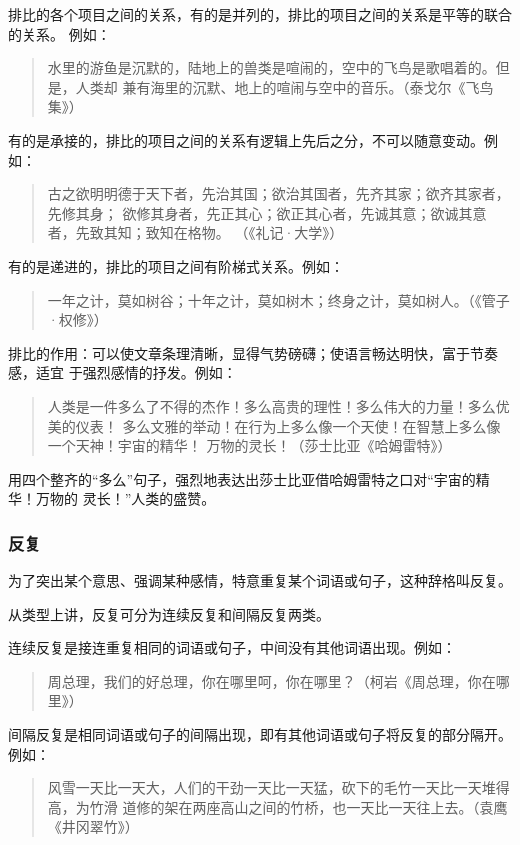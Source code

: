 \documentclass[final,oneside]{ctexbook}
\newenvironment{equotation}{\begin{quotation}\kaishu}{\end{quotation}}
\begin{document}
排比的各个项目之间的关系，有的是并列的，排比的项目之间的关系是平等的联合的关系。
例如：
\begin{equotation}
  水里的游鱼是沉默的，陆地上的兽类是喧闹的，空中的飞鸟是歌唱着的。但是，人类却
  兼有海里的沉默、地上的喧闹与空中的音乐。（泰戈尔《飞鸟集》）
\end{equotation}

有的是承接的，排比的项目之间的关系有逻辑上先后之分，不可以随意变动。例如：
\begin{equotation}
  古之欲明明德于天下者，先治其国；欲治其国者，先齐其家；欲齐其家者，先修其身；
  欲修其身者，先正其心；欲正其心者，先诚其意；欲诚其意者，先致其知；致知在格物。
  （《礼记·大学》）
\end{equotation}

有的是递进的，排比的项目之间有阶梯式关系。例如：
\begin{equotation}
  一年之计，莫如树谷；十年之计，莫如树木；终身之计，莫如树人。（《管子·权修》）
\end{equotation}

排比的作用：可以使文章条理清晰，显得气势磅礴；使语言畅达明快，富于节奏感，适宜
于强烈感情的抒发。例如：
\begin{equotation}
  人类是一件多么了不得的杰作！多么高贵的理性！多么伟大的力量！多么优美的仪表！
  多么文雅的举动！在行为上多么像一个天使！在智慧上多么像一个天神！宇宙的精华！
  万物的灵长！（莎士比亚《哈姆雷特》）
\end{equotation}
用四个整齐的“多么”句子，强烈地表达出莎士比亚借哈姆雷特之口对“宇宙的精华！万物的
灵长！”人类的盛赞。

\subsubsection{反复}

为了突出某个意思、强调某种感情，特意重复某个词语或句子，这种辞格叫反复。

从类型上讲，反复可分为连续反复和间隔反复两类。

连续反复是接连重复相同的词语或句子，中间没有其他词语出现。例如：

\begin{equotation}
  周总理，我们的好总理，你在哪里呵，你在哪里？（柯岩《周总理，你在哪里》）
\end{equotation}

间隔反复是相同词语或句子的间隔出现，即有其他词语或句子将反复的部分隔开。例如：

\begin{equotation}
  风雪一天比一天大，人们的干劲一天比一天猛，砍下的毛竹一天比一天堆得高，为竹滑
  道修的架在两座高山之间的竹桥，也一天比一天往上去。（袁鹰《井冈翠竹》）
\end{equotation}
\end{document}
